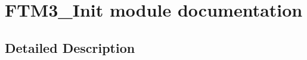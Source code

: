 \hypertarget{group___f_t_m3___init__module}{}\section{F\+T\+M3\+\_\+\+Init module documentation}
\label{group___f_t_m3___init__module}


\subsection{Detailed Description}
